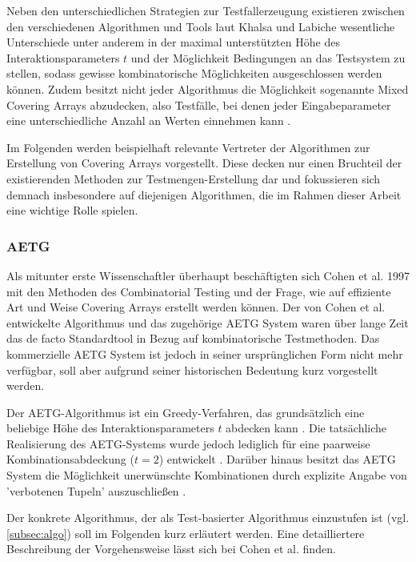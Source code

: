 Neben den unterschiedlichen Strategien zur Testfallerzeugung existieren zwischen den verschiedenen Algorithmen und Tools laut Khalsa und Labiche \cite{khalsa2014orchestrated} wesentliche Unterschiede unter anderem in der maximal unterstützten Höhe des Interaktionsparameters $t$ und der Möglichkeit Bedingungen an das Testsystem zu stellen, sodass gewisse kombinatorische Möglichkeiten ausgeschlossen werden können. Zudem besitzt nicht jeder Algorithmus die Möglichkeit sogenannte Mixed Covering Arrays abzudecken, also Testfälle, bei denen jeder Eingabeparameter eine unterschiedliche Anzahl an Werten einnehmen kann \cite{khalsa2014orchestrated}.

Im Folgenden werden beispielhaft relevante Vertreter der Algorithmen zur Erstellung von Covering Arrays vorgestellt. Diese decken nur einen Bruchteil der existierenden Methoden zur Testmengen-Erstellung dar und fokussieren sich demnach insbesondere auf diejenigen Algorithmen, die im Rahmen dieser Arbeit eine wichtige Rolle spielen.

\subsubsection{AETG}\label{subsub:aetg}

Als mitunter erste Wissenschaftler überhaupt beschäftigten sich Cohen et al. \cite{cohen1997aetg} 1997 mit den Methoden des Combinatorial Testing und der Frage, wie auf effiziente Art und Weise Covering Arrays erstellt werden können. Der von Cohen et al. \cite{cohen1997aetg} entwickelte Algorithmus und das zugehörige AETG System waren über lange Zeit das de facto Standardtool in Bezug auf kombinatorische Testmethoden. Das kommerzielle AETG System ist jedoch in seiner ursprünglichen Form nicht mehr verfügbar, soll aber aufgrund seiner historischen Bedeutung kurz vorgestellt werden.

Der AETG-Algorithmus ist ein Greedy-Verfahren, das grundsätzlich eine beliebige Höhe des Interaktionsparameters $t$ abdecken kann \cite{cohen1997aetg}. Die tatsächliche Realisierung des AETG-Systems wurde jedoch lediglich für eine paarweise Kombinationsabdeckung ($t = 2$) entwickelt \cite{khalsa2014orchestrated}. Darüber hinaus besitzt das AETG System die Möglichkeit unerwünschte Kombinationen durch explizite Angabe von 'verbotenen Tupeln' auszuschließen \cite{cohen1997aetg, khalsa2014orchestrated}.

Der konkrete Algorithmus, der als Test-basierter Algorithmus einzustufen ist (vgl. \autoref{subsec:algo}) soll im Folgenden kurz erläutert werden. Eine detailliertere Beschreibung der Vorgehensweise lässt sich bei Cohen et al. \cite{cohen1997aetg} finden. 

